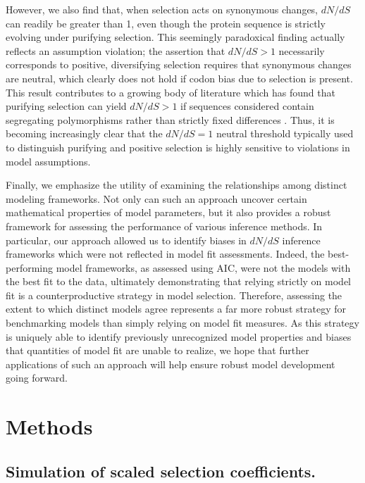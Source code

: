 \documentclass[11pt]{article}
\begin{document}
However, we also find that, when selection acts on synonymous changes, $dN/dS$ can readily be greater than 1, even though the protein sequence is strictly evolving under purifying selection. This seemingly paradoxical finding actually reflects an assumption violation; the assertion that $dN/dS > 1$ necessarily corresponds to positive, diversifying selection requires that synonymous changes are neutral, which clearly does not hold if codon bias due to selection is present. This result contributes to a growing body of literature which has found that purifying selection can yield $dN/dS > 1$ if sequences considered contain segregating polymorphisms rather than strictly fixed differences \cite{Rochaetal2006,KryazhimskiyPlotkin2008,Mugaletal2014}. Thus, it is becoming increasingly clear that the $dN/dS = 1$ neutral threshold typically used to distinguish purifying and positive selection is highly sensitive to violations in model assumptions. 


Finally, we emphasize the utility of examining the relationships among distinct modeling frameworks. Not only can such an approach uncover certain mathematical properties of model parameters, but it also provides a robust framework for assessing the performance of various inference methods. In particular, our approach allowed us to identify biases in $dN/dS$ inference frameworks which were not reflected in model fit assessments. Indeed, the best-performing model frameworks, as assessed using AIC, were not the models with the best fit to the data, ultimately demonstrating that relying strictly on model fit is a counterproductive strategy in model selection. Therefore, assessing the extent to which distinct models agree represents a far more robust strategy for benchmarking models than simply relying on model fit measures. As this strategy is uniquely able to identify previously unrecognized model properties and biases that quantities of model fit are unable to realize, we hope that further applications of such an approach will help ensure robust model development going forward.

\section*{Methods}

\subsection*{Simulation of scaled selection coefficients.}
\end{document}
